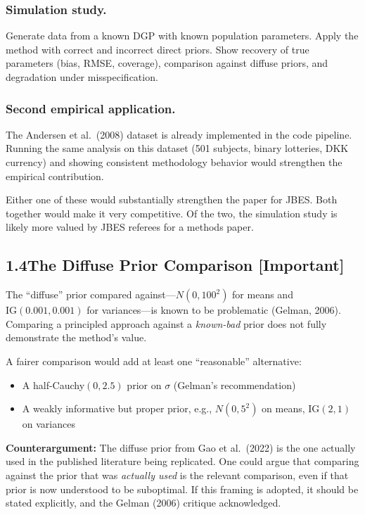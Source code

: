 \documentclass[12pt,a4paper]{article}
\begin{document}
\subsubsection{Simulation study.}
Generate data from a known DGP with known population parameters.  Apply the
method with correct and incorrect direct priors.  Show recovery of true
parameters (bias, RMSE, coverage), comparison against diffuse priors, and
degradation under misspecification.

\subsubsection{Second empirical application.}
The Andersen et al.\ (2008) dataset is already implemented in the code
pipeline.  Running the same analysis on this dataset (501 subjects, binary
lotteries, DKK currency) and showing consistent methodology behavior would
strengthen the empirical contribution.

\medskip

Either one of these would substantially strengthen the paper for JBES.  Both
together would make it very competitive.  Of the two, the simulation study is
likely more valued by JBES referees for a methods paper.

\subsection{1.4\quad The Diffuse Prior Comparison [Important]}

The ``diffuse'' prior compared against---$N(0, 100^2)$ for means and
$\text{IG}(0.001, 0.001)$ for variances---is known to be problematic (Gelman,
2006).  Comparing a principled approach against a \emph{known-bad} prior does
not fully demonstrate the method's value.

A fairer comparison would add at least one ``reasonable'' alternative:
\begin{itemize}[leftmargin=1.5em]
\item A half-Cauchy$(0, 2.5)$ prior on $\sigma$ (Gelman's recommendation)
\item A weakly informative but proper prior, e.g., $N(0, 5^2)$ on means,
$\text{IG}(2, 1)$ on variances
\end{itemize}

\textbf{Counterargument:} The diffuse prior from Gao et al.\ (2022) is the one
actually used in the published literature being replicated.  One could argue
that comparing against the prior that was \emph{actually used} is the relevant
comparison, even if that prior is now understood to be suboptimal.  If this
framing is adopted, it should be stated explicitly, and the Gelman (2006)
critique acknowledged.
\end{document}
